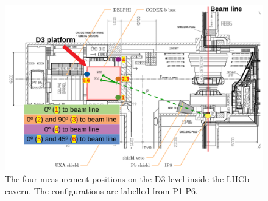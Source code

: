 \begin{figure}
\centering
    \includegraphics[width=16cm]{figs/INT/configuration.pdf}
\caption{\label{fig:posconfig}
    The four measurement positions on the D3 level inside the LHCb cavern. The configurations are labelled from P1-P6.
}
\end{figure}


